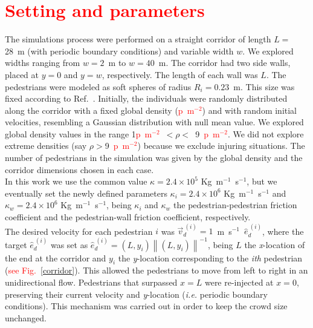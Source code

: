 \documentclass[preprint,12pt]{elsarticle}
\begin{document}
\section{\label{simulations}\textcolor{red}{Setting and parameters}}

The simulations process were performed on a straight corridor of length $L=$ 
28~m (with periodic boundary conditions) and variable width $w$. We explored 
widths ranging from $w=2$~m to $w=40$~m. The corridor had two side walls, placed 
at $y=0$ and $y=w$, respectively. The length of each wall was $L$. The 
pedestrians were modeled as soft spheres of radius $R_i=0.23$~m. This size was 
fixed according to Ref.~\cite{metric_handbook}. Initially, the individuals were 
randomly distributed along the corridor with a fixed global density 
(\textcolor{red}{p~m$^{-2}$}) and with random initial velocities, resembling a 
Gaussian distribution with null mean value. We explored global density values in 
the range 1\textcolor{red}{p~m$^{-2}$}~$<\rho<$~9~\textcolor{red}{p~m$^{-2}$}. 
We did not explore extreme densities (say $\rho>$9~\textcolor{red}{p~m$^{-2}$}) 
because we exclude injuring situations. The number of pedestrians in the 
simulation was given by the global density and the corridor dimensions chosen in 
each case. \\

In this work we use the common value $\kappa=2.4 \times 
10^{5}$ Kg~m$^{-1}$~s$^{-1}$, but we eventually set the newly defined 
parameters $\kappa_i=2.4 \times 10^{6}$ Kg~m$^{-1}$~s$^{-1}$  and $\kappa_w=2.4 
\times 10^{6}$ Kg~m$^{-1}$~s$^{-1}$, being $\kappa_i$ and $\kappa_w$ the 
pedestrian-pedestrian friction coefficient and the pedestrian-wall friction 
coefficient, respectively. \\

The desired velocity for each pedestrian $i$ was 
$\vec{v}_d^{~(i)}=1$~m~s$^{-1}$~$\hat{e}_d^{~(i)}$, where the target $\hat{e}_d^{~(i)}$ 
was set as $\hat{e}_d^{~(i)}=(L,y_i)\left \| (L,y_i) \right \|^{-1}$, being $L$ 
the \textit{x}-location of the end at the corridor and $y_i$ the 
\textit{y}-location corresponding to the \textit{ith} pedestrian 
(\textcolor{red}{see Fig.~\ref{corridor}}). This allowed the pedestrians to 
move from left to right in an unidirectional flow. Pedestrians that surpassed 
$x=L$ were re-injected at $x=0$, preserving their current velocity and 
\textit{y}-location (\textit{i.e.} periodic boundary conditions). This mechanism 
was carried out in order to keep
the crowd size unchanged.\\
\end{document}
